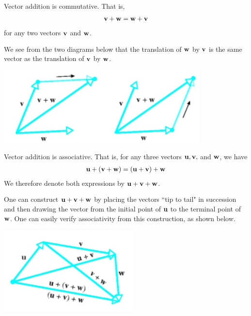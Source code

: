 \documentclass[12pt,letterpaper,reqno]{article}
\numberwithin{equation}{section}
\begin{document}
\begin{prop}
	Vector addition is commutative. That is, 
	\begin{align*}
		{\bf v}+{\bf w}={\bf w}+{\bf v}
	\end{align*}
	for any two vectors ${\bf v}$ and ${\bf w}$.
\end{prop}

\begin{pf}
	We see from the two diagrams below that the translation of ${\bf w}$ by ${\bf v}$ is the same vector as the translation of ${\bf v}$ by ${\bf w}$.
\begin{center}
	\includegraphics[scale=0.5]{figures_mvc/equivalence_of_vector_addition}
\end{center}

\end{pf}

\begin{prop}
	Vector addition is associative. That is, for any three vectors ${\bf u}, {\bf v},$ and ${\bf w}$, we have
	\begin{align*}
		{\bf u}+({\bf v}+{\bf w})=({\bf u}+{\bf v})+{\bf w}
	\end{align*}
We therefore denote both expressions by ${\bf u}+{\bf v}+{\bf w}$. 
\end{prop}

\begin{pf}
One can construct ${\bf u}+{\bf v}+{\bf w}$ by placing the vectors ``tip to tail" in succession and then drawing the vector from the initial point of ${\bf u}$ to the terminal point of ${\bf w}$. One can easily verify associativity from this construction, as shown below.
\end{pf}

\begin{center}
	\includegraphics[scale=0.5]{figures_mvc/associativity_of_vector_addition}
\end{center}
\end{document}
